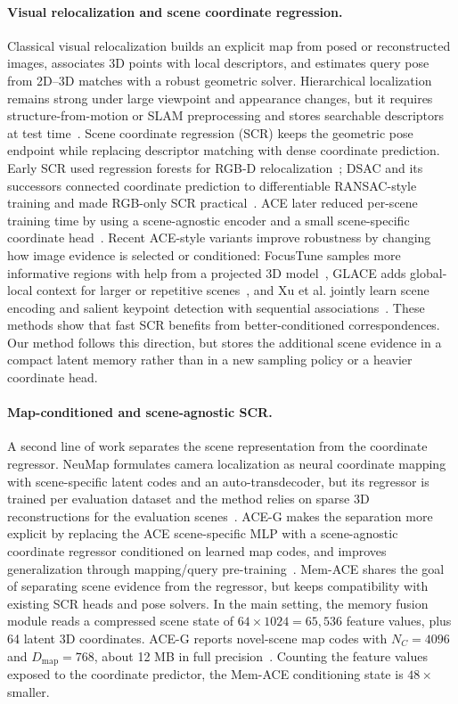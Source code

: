 \documentclass[letterpaper]{article} %
\newcommand{\shortmethod}{Mem-ACE}
\begin{document}
\paragraph{Visual relocalization and scene coordinate regression.}
Classical visual relocalization builds an explicit map from posed or reconstructed images, associates 3D points with local descriptors, and estimates query pose from 2D--3D matches with a robust geometric solver. Hierarchical localization remains strong under large viewpoint and appearance changes, but it requires structure-from-motion or SLAM preprocessing and stores searchable descriptors at test time~\citep{sarlin2019coarse}. Scene coordinate regression (SCR) keeps the geometric pose endpoint while replacing descriptor matching with dense coordinate prediction. Early SCR used regression forests for RGB-D relocalization~\citep{shotton2013scrf}; DSAC and its successors connected coordinate prediction to differentiable RANSAC-style training and made RGB-only SCR practical~\citep{brachmann2017dsac,brachmann2018lessmore,brachmann2021dsacstar}. ACE later reduced per-scene training time by using a scene-agnostic encoder and a small scene-specific coordinate head~\citep{brachmann2023ace}. Recent ACE-style variants improve robustness by changing how image evidence is selected or conditioned: FocusTune samples more informative regions with help from a projected 3D model~\citep{nguyen2024focustune}, GLACE adds global-local context for larger or repetitive scenes~\citep{GLACE2024CVPR}, and Xu et al. jointly learn scene encoding and salient keypoint detection with sequential associations~\citep{xu2024efficient}. These methods show that fast SCR benefits from better-conditioned correspondences. Our method follows this direction, but stores the additional scene evidence in a compact latent memory rather than in a new sampling policy or a heavier coordinate head.

\paragraph{Map-conditioned and scene-agnostic SCR.}
A second line of work separates the scene representation from the coordinate regressor. NeuMap formulates camera localization as neural coordinate mapping with scene-specific latent codes and an auto-transdecoder, but its regressor is trained per evaluation dataset and the method relies on sparse 3D reconstructions for the evaluation scenes~\citep{tang2023neumap}. ACE-G makes the separation more explicit by replacing the ACE scene-specific MLP with a scene-agnostic coordinate regressor conditioned on learned map codes, and improves generalization through mapping/query pre-training~\citep{bruns2025aceg}. \shortmethod{} shares the goal of separating scene evidence from the regressor, but keeps compatibility with existing SCR heads and pose solvers. In the main setting, the memory fusion module reads a compressed scene state of $64\times1024=65{,}536$ feature values, plus 64 latent 3D coordinates. ACE-G reports novel-scene map codes with $N_C=4096$ and $D_{\mathrm{map}}=768$, about 12 MB in full precision~\citep{bruns2025aceg}. Counting the feature values exposed to the coordinate predictor, the \shortmethod{} conditioning state is $48\times$ smaller.
\end{document}
